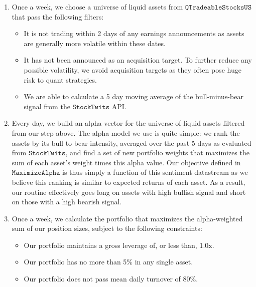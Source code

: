 \documentclass[11pt,]{article}
\providecommand{\tightlist}{%
\setlength{\itemsep}{0pt}\setlength{\parskip}{0pt}}
\begin{document}
\begin{enumerate}
\def\labelenumi{\arabic{enumi}.}
\tightlist
\item
  Once a week, we choose a universe of liquid assets from
  \(\texttt{QTradeableStocksUS}\) that pass the following filters:

  \begin{itemize}
  \tightlist
  \item
    It is not trading within 2 days of any earnings announcements as
    assets are generally more volatile within these dates.
  \item
    It has not been announced as an acquisition target. To further
    reduce any possible volatility, we avoid acquisition targets as they
    often pose huge risk to quant strategies.
  \item
    We are able to calculate a 5 day moving average of the
    bull-minus-bear signal from the \(\texttt{StockTwits}\) API.
  \end{itemize}
\item
  Every day, we build an alpha vector for the universe of liquid assets
  filtered from our step above. The alpha model we use is quite simple:
  we rank the assets by its bull-to-bear intensity, averaged over the
  past 5 days as evaluated from \(\texttt{StockTwits}\), and find a set
  of new portfolio weights that maximizes the sum of each asset's weight
  times this alpha value. Our objective defined in
  \(\texttt{MaximizeAlpha}\) is thus simply a function of this sentiment
  datastream as we believe this ranking is similar to expected returns
  of each asset. As a result, our routine effectively goes long on
  assets with high bullish signal and short on those with a high bearish
  signal.\\
\item
  Once a week, we calculate the portfolio that maximizes the
  alpha-weighted sum of our position sizes, subject to the following
  constraints:

  \begin{itemize}
  \tightlist
  \item
    Our portfolio maintains a gross leverage of, or less than, 1.0x.
  \item
    Our portfolio has no more than 5\% in any single asset.
  \item
    Our portfolio does not pass mean daily turnover of 80\%.
  \end{itemize}
\end{enumerate}
\end{document}
